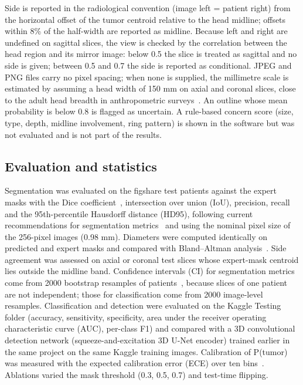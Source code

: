 \documentclass[pdflatex,sn-vancouver-num,iicol]{sn-jnl}
\begin{document}
Side is reported in the radiological convention (image left = patient right) from the horizontal offset of the tumor centroid relative to the head midline; offsets within 8\% of the half-width are reported as midline. Because left and right are undefined on sagittal slices, the view is checked by the correlation between the head region and its mirror image: below 0.5 the slice is treated as sagittal and no side is given; between 0.5 and 0.7 the side is reported as conditional. JPEG and PNG files carry no pixel spacing; when none is supplied, the millimetre scale is estimated by assuming a head width of 150 mm on axial and coronal slices, close to the adult head breadth in anthropometric surveys~\cite{gordon2014ansur}. An outline whose mean probability is below 0.8 is flagged as uncertain. A rule-based concern score (size, type, depth, midline involvement, ring pattern) is shown in the software but was not evaluated and is not part of the results.

\subsection{Evaluation and statistics}

Segmentation was evaluated on the figshare test patients against the expert masks with the Dice coefficient~\cite{dice1945}, intersection over union (IoU), precision, recall and the 95th-percentile Hausdorff distance (HD95), following current recommendations for segmentation metrics~\cite{maierhein2024metrics} and using the nominal pixel size of the 256-pixel images (0.98 mm). Diameters were computed identically on predicted and expert masks and compared with Bland--Altman analysis~\cite{bland1986}. Side agreement was assessed on axial or coronal test slices whose expert-mask centroid lies outside the midline band. Confidence intervals (CI) for segmentation metrics come from 2000 bootstrap resamples of patients~\cite{efron1993bootstrap}, because slices of one patient are not independent; those for classification come from 2000 image-level resamples. Classification and detection were evaluated on the Kaggle Testing folder (accuracy, sensitivity, specificity, area under the receiver operating characteristic curve (AUC), per-class F1) and compared with a 3D convolutional detection network (squeeze-and-excitation 3D U-Net encoder) trained earlier in the same project on the same Kaggle training images. Calibration of P(tumor) was measured with the expected calibration error (ECE) over ten bins~\cite{guo2017calibration}. Ablations varied the mask threshold (0.3, 0.5, 0.7) and test-time flipping.
\end{document}
